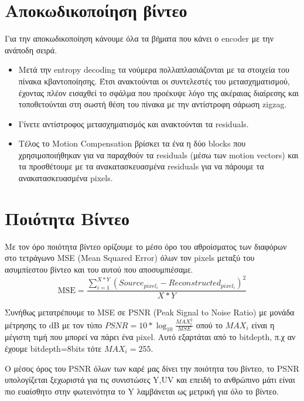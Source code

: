 \section{Αποκωδικοποίηση βίντεο}
\label{section:sect26}

\indent Για την αποκωδικοποίηση κάνουμε όλα τα βήματα που κάνει ο encoder με την ανάποδη σειρά.

\begin{itemize}
  \item Μετά την entropy decoding τα νούμερα πολλαπλασιάζονται με τα στοιχεία του πίνακα κβαντοποίησης. Έτσι ανακτούνται οι συντελεστές του μετασχηματισμού, έχοντας πλέον εισαχθεί το σφάλμα που προέκυψε λόγο της ακέραιας διαίρεσης και τοποθετούνται στη σωστή θέση του πίνακα με την αντίστροφη σάρωση zigzag.
  \item Γίνετε αντίστροφος μετασχηματισμός και ανακτούνται τα residuals.
  \item Τέλος το Motion Compensation βρίσκει τα ένα η δύο blocks που χρησιμοποιήθηκαν για να παραχθούν τα residuals (μέσω των motion vectors) και τα προσθέτουμε με τα ανακατασκευασμένα residuals για να πάρουμε τα ανακατασκευασμένα pixels.
\end{itemize}

\section{Ποιότητα Βίντεο}
\label{section:sect27}

\indent Με τον όρο ποιότητα βίντεο ορίζουμε το μέσο όρο του αθροίσματος των διαφόρων στο τετράγωνο MSE (Mean Squared Error) όλων τον pixels μεταξύ του ασυμπίεστου βίντεο και του αυτού που αποσυμπιέσαμε. \begin{equation}
\text{MSE} =
\frac{\displaystyle\sum_{i=1}^{X*Y}
(Source_{pixel_i}-Reconstructed_{pixel_i})^{2}}{X*Y}
\end{equation}

\indent Συνήθως μετατρέπουμε το MSE σε PSNR (Peak Signal to Noise Ratio)  με μονάδα μέτρησης το \si{}{dB} με τον τύπο  $ PSNR = 10*\log_{10}{\frac{MAX_i^2}{MSE}}$ οπού το $MAX_i$ είναι η μέγιστη τιμή που μπορεί να πάρει ένα pixel. Αυτό εξαρτάται από το bitdepth, π.χ αν έχουμε bitdepth=8bits τότε $ MAX_i=255$.

\indent Ο μέσος όρος του PSNR όλων των καρέ μας δίνει την ποιότητα του βίντεο, το PSNR υπολογίζεται ξεχωριστά για τις συνιστώσες Y,UV και επειδή το ανθρώπινο μάτι είναι πιο ευαίσθητο στην φωτεινότητα το Y λαμβάνεται ως μετρική για όλο το βίντεο.

